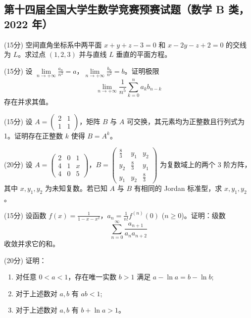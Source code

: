 \documentclass[loose]{ExBook}
\begin{document}
\subsection{第十四届全国大学生数学竞赛预赛试题（数学 B 类， 2022 年）}
\begin{qitems}
    \begin{bbox}
        \qitem (15分) 空间直角坐标系中两平面 \( x + y + z - 3 = 0 \) 和 \( x - 2y - z + 2 = 0 \) 的交线为 \( L \)。求过点 \( (1, 2, 3) \) 并与直线 \( L \) 垂直的平面方程。
    \end{bbox}

    \begin{bbox}
        \qitem (15分) 设 \(\lim\limits_{n \to +\infty} \frac{a_n}{n^2} = a\)，\(\lim\limits_{n \to +\infty} \frac{b_n}{n^2} = b\)。证明极限 
        \[
        \lim\limits_{n \to +\infty} \frac{1}{n^5} \sum_{k=0}^n a_k b_{n-k}
        \] 
        存在并求其值。
    \end{bbox}

    \begin{bbox}
        \qitem (15分) 设 \( A = \begin{pmatrix} 2 & 1 \\ 1 & 1 \end{pmatrix} \)，矩阵 \( B \) 与 \( A \) 可交换，其元素均为正整数且行列式为 1。证明存在正整数 \( k \) 使得 \( B = A^k \)。
    \end{bbox}

    \begin{bbox}
        \qitem (20分) 设 \( A = \begin{pmatrix} 2 & 0 & 1 \\ 4 & 1 & x \\ 4 & 0 & 5 \end{pmatrix} \)，\( B = \begin{pmatrix} \frac{8}{3} & y_1 & y_2 \\ y_2 & \frac{8}{3} & y_1 \\ y_1 & y_2 & \frac{8}{3} \end{pmatrix} \) 为复数域上的两个 3 阶方阵，其中 \( x, y_1, y_2 \) 为未知复数。若已知 \( A \) 与 \( B \) 有相同的 Jordan 标准型，求 \( x, y_1, y_2 \)。
    \end{bbox}

    \begin{bbox}
        \qitem (15分) 设函数 \( f(x) = \frac{1}{1 - x - x^2} \)，\( a_n = \frac{1}{n!} f^{(n)}(0) \) (\( n \geq 0 \))。证明：级数 
        \[
        \sum_{n=0}^{\infty} \frac{a_{n+1}}{a_n a_{n+2}}
        \] 
        收敛并求它的和。
    \end{bbox}

    \begin{bbox}
        \qitem (20分) 证明：
        \begin{enumerate}[label=(\arabic*)]
            \item 对任意 \( 0 < a < 1 \)，存在唯一实数 \( b > 1 \) 满足 \( a - \ln a = b - \ln b \);
            \item 对于上述数对 \( a, b \) 有 \( ab < 1 \);
            \item 对于上述数对 \( a, b \) 有 \( b + \ln a > 1 \)。
        \end{enumerate}
    \end{bbox}
\end{qitems}
\end{document}
